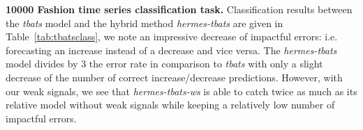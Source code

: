 \documentclass[10pt]{article} %
\begin{document}
\textbf{10000 Fashion time series classification task. } Classification results between the \textit{tbats} model and the hybrid method \textit{hermes-tbats} are given in Table~\ref{tab:tbatsclass}, we note an impressive decrease of impactful errors: i.e. forecasting an increase instead of a decrease and vice versa. The \textit{hermes-tbats} model divides by 3 the error rate in comparison to \textit{tbats} with only a slight decrease of the number of correct increase/decrease predictions. However, with our weak signals, we see that \textit{hermes-tbats-ws} is able to catch twice as much as its relative model without weak signals while keeping a relatively low number of impactful errors.

\begin{table}
  \caption{\textit{tbats}, \textit{hermes-tbats} and \textit{hermes-tbats-ws} models confusion matrix}
\centering
\vspace{0.2cm}
\vspace{.2cm}
\vspace{.2cm}
\label{tab:tbatsclass}
\end{table}
\end{document}
